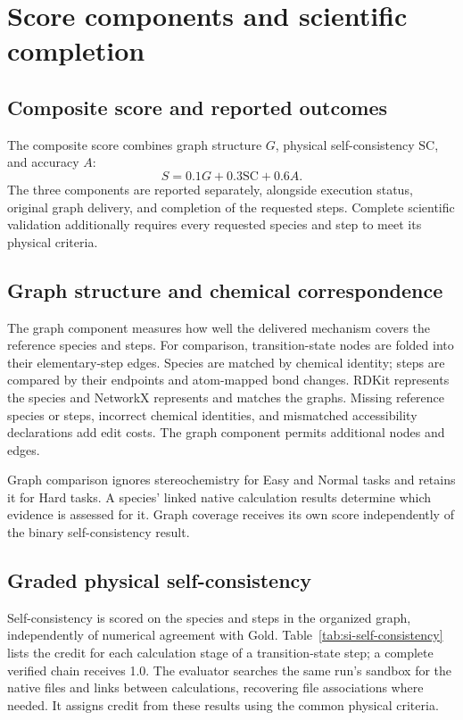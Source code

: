 \section{Score components and scientific completion}
\label{sec:si-scoring}

\subsection{Composite score and reported outcomes}
The composite score combines graph structure $G$, physical self-consistency $\mathrm{SC}$, and accuracy $A$:
\begin{equation}
S=0.1G+0.3\mathrm{SC}+0.6A.
\label{eq:si-composite}
\end{equation}
The three components are reported separately, alongside execution status, original graph delivery, and completion of the requested steps. Complete scientific validation additionally requires every requested species and step to meet its physical criteria.

\subsection{Graph structure and chemical correspondence}
The graph component measures how well the delivered mechanism covers the reference species and steps. For comparison, transition-state nodes are folded into their elementary-step edges. Species are matched by chemical identity; steps are compared by their endpoints and atom-mapped bond changes. RDKit represents the species and NetworkX represents and matches the graphs.\citep{ref13,networkx2008} Missing reference species or steps, incorrect chemical identities, and mismatched accessibility declarations add edit costs. The graph component permits additional nodes and edges.

Graph comparison ignores stereochemistry for Easy and Normal tasks and retains it for Hard tasks. A species' linked native calculation results determine which evidence is assessed for it. Graph coverage receives its own score independently of the binary self-consistency result.

\subsection{Graded physical self-consistency}
Self-consistency is scored on the species and steps in the organized graph, independently of numerical agreement with Gold. Table~\ref{tab:si-self-consistency} lists the credit for each calculation stage of a transition-state step; a complete verified chain receives 1.0. The evaluator searches the same run's sandbox for the native files and links between calculations, recovering file associations where needed. It assigns credit from these results using the common physical criteria.

